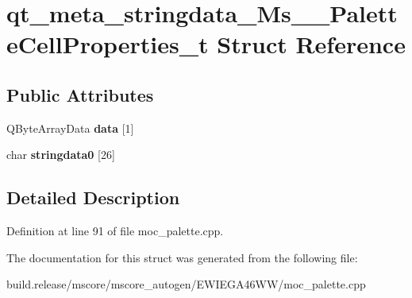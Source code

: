 \hypertarget{structqt__meta__stringdata___ms_____palette_cell_properties__t}{}\section{qt\+\_\+meta\+\_\+stringdata\+\_\+\+Ms\+\_\+\+\_\+\+Palette\+Cell\+Properties\+\_\+t Struct Reference}
\label{structqt__meta__stringdata___ms_____palette_cell_properties__t}
\subsection*{Public Attributes}
\begin{DoxyCompactItemize}
\item 
\mbox{\label{structqt__meta__stringdata___ms_____palette_cell_properties__t_adc3ef3198d28adf4e085b0f0c21dd124}} 
Q\+Byte\+Array\+Data {\bfseries data} \mbox{[}1\mbox{]}
\item 
\mbox{\label{structqt__meta__stringdata___ms_____palette_cell_properties__t_aae9eb4d9a26cffde754251f06671c444}} 
char {\bfseries stringdata0} \mbox{[}26\mbox{]}
\end{DoxyCompactItemize}


\subsection{Detailed Description}


Definition at line 91 of file moc\+\_\+palette.\+cpp.



The documentation for this struct was generated from the following file\+:\begin{DoxyCompactItemize}
\item 
build.\+release/mscore/mscore\+\_\+autogen/\+E\+W\+I\+E\+G\+A46\+W\+W/moc\+\_\+palette.\+cpp\end{DoxyCompactItemize}
